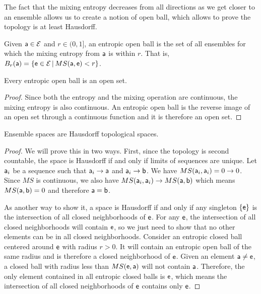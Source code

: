 The fact that the mixing entropy decreases from all directions as we get closer to an ensemble allows us to create a notion of open ball, which allows to prove the topology is at least Hausdorff.

\begin{mathSection}
\begin{defn}
	Given $\ens[a] \in \Ens$ and $r \in (0,1]$, an entropic open ball is the set of all ensembles for which the mixing entropy from $\ens[a]$ is within $r$. That is, $B_r(\ens[a]) = \{\ens \in \Ens \, | \, MS(\ens[a], \ens) < r\}$.
\end{defn}
\begin{coro}
	Every entropic open ball is an open set.
\end{coro}

\begin{proof}
	Since both the entropy and the mixing operation are continuous, the mixing entropy is also continuous. An entropic open ball is the reverse image of an open set through a continuous function and it is therefore an open set.
\end{proof}

\begin{prop}\label{pm-es-Hausdorff}
	Ensemble spaces are Hausdorff topological spaces.
\end{prop}

\begin{proof}
	We will prove this in two ways. First, since the topology is second countable, the space is Hausdorff if and only if limits of sequences are unique. Let $\ens[a]_i$ be a sequence such that $\ens[a]_i \to \ens[a]$ and $\ens[a]_i \to \ens[b]$. We have $MS(\ens[a]_i, \ens[a]_i) = 0 \to 0$. Since $MS$ is continuous, we also have $MS(\ens[a]_i, \ens[a]_i) \to MS(\ens[a], \ens[b])$ which means $MS(\ens[a], \ens[b]) = 0$ and therefore $\ens[a] = \ens[b]$.
	
	As another way to show it, a space is Hausdorff if and only if any singleton $\{\ens\}$ is the intersection of all closed neighborhoods of $\ens$. For any $\ens$, the intersection of all closed neighborhoods will contain $\ens$, so we just need to show that no other elements can be in all closed neighborhoods. Consider an entropic closed ball centered around $\ens$ with radius $r>0$. It will contain an entropic open ball of the same radius and is therefore a closed neighborhood of $\ens$. Given an element $\ens[a] \neq \ens$, a closed ball with radius less than $MS(\ens, \ens[a])$ will not contain $\ens[a]$. Therefore, the only element contained in all entropic closed balls is $\ens$, which means the intersection of all closed neighborhoods of $\ens$ contains only $\ens$.
\end{proof}


\end{mathSection}
